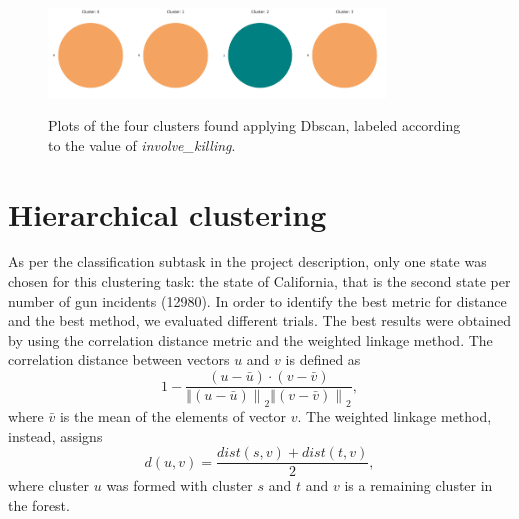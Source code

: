 \documentclass[10pt,a4paper]{report}
\begin{document}
\begin{figure}[h]
	\centering
	\includegraphics[width=0.2\textwidth]{dbscan_0}\includegraphics[width=0.2\textwidth]{dbscan_1}\includegraphics[width=0.2\textwidth]{dbscan_2}\includegraphics[width=0.2\textwidth]{dbscan_3}
	\caption{Plots of the four clusters found applying Dbscan, labeled according to the value of \textit{involve\_killing}.}
	\label{xmeans_killing}
\end{figure}

\section{Hierarchical clustering}

As per the classification subtask in the project description, only one state was chosen for this clustering task: the state of California, that is the second state per number of gun incidents (12980).
In order to identify the best metric for distance and the best method, we evaluated different trials.
The best results were obtained by using the correlation distance metric and the weighted linkage method.
The correlation distance between vectors $u$ and $v$ is defined as
$$1 - \frac{(u-\bar{u})\cdot(v-\bar{v})}{\left \Vert (u-\bar{u}) \right \|_2 \left \Vert (v-\bar{v}) \right \|_2},$$
where $\bar{v}$ is the mean of the elements of vector $v$.
The weighted linkage method, instead, assigns $$d(u,v) = \frac{dist(s,v)+dist(t,v)}{2},$$
where cluster $u$ was formed with cluster $s$ and $t$ and $v$ is a remaining cluster in the forest.
\end{document}
